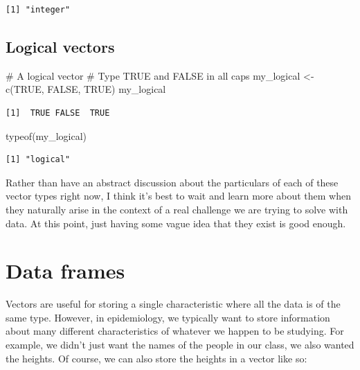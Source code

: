 \documentclass[
  letterpaper,
  DIV=11,
  numbers=noendperiod]{scrreprt}
\newenvironment{Shaded}{\begin{snugshade}}{\end{snugshade}}
\newcommand{\CommentTok}[1]{\textcolor[rgb]{0.37,0.37,0.37}{#1}}
\newcommand{\ConstantTok}[1]{\textcolor[rgb]{0.56,0.35,0.01}{#1}}
\newcommand{\FunctionTok}[1]{\textcolor[rgb]{0.28,0.35,0.67}{#1}}
\newcommand{\NormalTok}[1]{\textcolor[rgb]{0.00,0.23,0.31}{#1}}
\newcommand{\OtherTok}[1]{\textcolor[rgb]{0.00,0.23,0.31}{#1}}
\begin{document}
\begin{verbatim}
[1] "integer"
\end{verbatim}

\subsection{Logical vectors}\label{logical-vectors}

\begin{Shaded}
\begin{Highlighting}[]
\CommentTok{\# A logical vector}
\CommentTok{\# Type TRUE and FALSE in all caps}
\NormalTok{my\_logical }\OtherTok{\textless{}{-}} \FunctionTok{c}\NormalTok{(}\ConstantTok{TRUE}\NormalTok{, }\ConstantTok{FALSE}\NormalTok{, }\ConstantTok{TRUE}\NormalTok{)}
\NormalTok{my\_logical}
\end{Highlighting}
\end{Shaded}

\begin{verbatim}
[1]  TRUE FALSE  TRUE
\end{verbatim}

\begin{Shaded}
\begin{Highlighting}[]
\FunctionTok{typeof}\NormalTok{(my\_logical)}
\end{Highlighting}
\end{Shaded}

\begin{verbatim}
[1] "logical"
\end{verbatim}

Rather than have an abstract discussion about the particulars of each of
these vector types right now, I think it's best to wait and learn more
about them when they naturally arise in the context of a real challenge
we are trying to solve with data. At this point, just having some vague
idea that they exist is good enough.

\section{Data frames}\label{data-frames}

Vectors are useful for storing a single characteristic where all the
data is of the same type. However, in epidemiology, we typically want to
store information about many different characteristics of whatever we
happen to be studying. For example, we didn't just want the names of the
people in our class, we also wanted the heights. Of course, we can also
store the heights in a vector like so:
\end{document}
